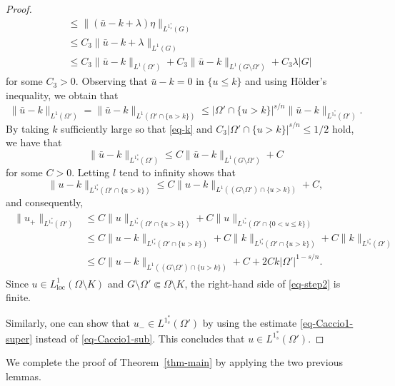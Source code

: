 \documentclass{amsart}
\theoremstyle{plain}
\theoremstyle{definition}
\numberwithin{equation}{section}
\begin{document}
\begin{proof}
\begin{align*}
&\leq \|(\bar{u}-k+\lambda)\eta\|_{L^{1^{\ast}_s}(G)} \\
&\leq C_3 \|\bar{u}-k+\lambda\|_{L^1(G)} \\
&\leq C_3 \|\bar{u}-k\|_{L^1(\Omega')} + C_3 \|\bar{u}-k\|_{L^1(G\setminus \Omega')} + C_3 \lambda |G|
\end{align*}
for some $C_3>0$. Observing that $\bar{u}-k=0$ in $\{u \leq k\}$ and using H\"older's inequality, we obtain that
\begin{equation*}
\|\bar{u}-k\|_{L^1(\Omega')} = \|\bar{u}-k\|_{L^1(\Omega' \cap \{u > k\})} \leq |\Omega' \cap \{u>k\}|^{s/n} \|\bar{u}-k\|_{L^{1^{\ast}_s}(\Omega')}.
\end{equation*}
By taking $k$ sufficiently large so that \eqref{eq-k} and $C_3 |\Omega' \cap \{u>k\}|^{s/n} \leq 1/2$ hold, we have that
\begin{equation*}
\|\bar{u}-k\|_{L^{1^{\ast}_s}(\Omega')} \leq C \|\bar{u}-k\|_{L^1(G\setminus \Omega')} + C
\end{equation*}
for some $C>0$. Letting $l$ tend to infinity shows that
\begin{equation*}
\|u-k\|_{L^{1^{\ast}_s}(\Omega' \cap \{u>k\})} \leq C \|u-k\|_{L^1((G\setminus \Omega')\cap \{u>k\})} + C,
\end{equation*}
and consequently,
\begin{align}\label{eq-step2}
\begin{split}
\|u_+\|_{L^{1^{\ast}_s}(\Omega')}
&\leq C \|u\|_{L^{1^{\ast}_s}(\Omega' \cap \{u>k\})} + C \|u\|_{L^{1^{\ast}_s}(\Omega' \cap \{0<u\leq k\})} \\
&\leq C \|u-k\|_{L^{1^{\ast}_s}(\Omega' \cap \{u>k\})} + C \|k\|_{L^{1^{\ast}_s}(\Omega' \cap \{u>k\})} + C \|k\|_{L^{1^{\ast}_s}(\Omega')} \\
&\leq C \|u-k\|_{L^1((G\setminus \Omega')\cap \{u>k\})} + C + 2Ck|\Omega'|^{1-s/n}.
\end{split}
\end{align}
Since $u \in L^1_{\mathrm{loc}}(\Omega \setminus K)$ and $G \setminus \Omega' \Subset \Omega \setminus K$, the right-hand side of \eqref{eq-step2} is finite.

Similarly, one can show that $u_- \in L^{1^{\ast}_s}(\Omega')$ by using the estimate \eqref{eq-Caccio1-super} instead of \eqref{eq-Caccio1-sub}. This concludes that $u \in L^{1^{\ast}_s}(\Omega')$.
\end{proof}

We complete the proof of Theorem~\ref{thm-main} by applying the two previous lemmas.
\end{document}
